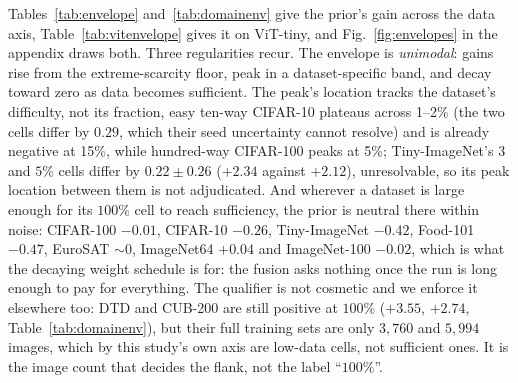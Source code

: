  Tables~\ref{tab:envelope} and~\ref{tab:domainenv} give the
prior's gain across the data axis, Table~\ref{tab:vitenvelope} gives it on
ViT-tiny, and Fig.~\ref{fig:envelopes} in the appendix draws both. Three regularities recur. The
envelope is \emph{unimodal}: gains rise from the extreme-scarcity floor, peak
in a dataset-specific band, and decay toward zero as data becomes sufficient.
The peak's location tracks the dataset's difficulty, not its fraction, easy
ten-way CIFAR-10 plateaus across 1--2\% (the two cells differ by $0.29$, which
their seed uncertainty cannot resolve) and is already negative at 15\%, while
hundred-way CIFAR-100 peaks at 5\%; Tiny-ImageNet's $3$ and $5\%$ cells
differ by $0.22 \pm 0.26$ ($+2.34$ against $+2.12$), unresolvable, so its
peak location between them is not adjudicated. And wherever a dataset is large enough for
its $100\%$ cell to reach sufficiency, the prior is neutral there within noise:
CIFAR-100 $-0.01$, CIFAR-10 $-0.26$, Tiny-ImageNet $-0.42$, Food-101 $-0.47$,
EuroSAT ${\sim}0$, ImageNet64 $+0.04$ and ImageNet-100 $-0.02$, which is what
the decaying weight schedule is for: the fusion asks nothing once the run is
long enough to pay for everything. The qualifier is not cosmetic and we enforce it elsewhere
too: DTD and CUB-200 are still positive at $100\%$ ($+3.55$, $+2.74$,
Table~\ref{tab:domainenv}), but their full training sets are only $3{,}760$ and
$5{,}994$ images, which by this study's own axis are low-data cells, not
sufficient ones. It is the image count that decides the flank, not the label
``$100\%$''.

